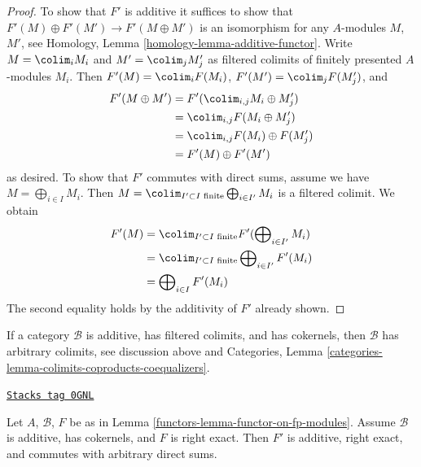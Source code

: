 \begin{proof}
To show that $F'$ is additive it suffices to show
that $F'(M) \oplus F'(M') \to F'(M \oplus M')$ is an isomorphism for
any $A$-modules $M$, $M'$, see
Homology, Lemma \ref{homology-lemma-additive-functor}.
Write $M = \colim_i M_i$ and $M' = \colim_j M'_j$ as filtered colimits
of finitely presented $A$-modules $M_i$. Then
$F'(M) = \colim_i F(M_i)$, $F'(M') = \colim_j F(M'_j)$, and
\begin{align*}
F'(M \oplus M')
& =
F'(\colim_{i, j} M_i \oplus M'_j) \\
& =
\colim_{i, j} F(M_i \oplus M'_j) \\
& =
\colim_{i, j} F(M_i) \oplus F(M'_j) \\
& =
F'(M) \oplus F'(M')
\end{align*}
as desired. To show that $F'$ commutes with direct sums, assume
we have $M = \bigoplus_{i \in I} M_i$. Then
$M = \colim_{I' \subset I\text{ finite}} \bigoplus_{i \in I'} M_i$
is a filtered colimit. We obtain
\begin{align*}
F'(M)
& =
\colim_{I' \subset I\text{ finite}}
F'(\bigoplus\nolimits_{i \in I'} M_i) \\
& =
\colim_{I' \subset I\text{ finite}}
\bigoplus\nolimits_{i \in I'} F'(M_i) \\
& =
\bigoplus\nolimits_{i \in I} F'(M_i)
\end{align*}
The second equality holds by the additivity of $F'$ already shown.
\end{proof}

If a category $\mathcal{B}$ is additive, has filtered colimits, and
has cokernels, then $\mathcal{B}$ has arbitrary colimits, see
discussion above and Categories, Lemma
\ref{categories-lemma-colimits-coproducts-coequalizers}.

\begin{lemma}
\label{functors-lemma-functor-on-fp-modules-right-exact}
\href{https://stacks.math.columbia.edu/tag/0GNL}{\texttt{Stacks tag 0GNL}}

Let $A$, $\mathcal{B}$, $F$ be as in Lemma \ref{functors-lemma-functor-on-fp-modules}.
Assume $\mathcal{B}$ is additive, has cokernels, and $F$ is right exact. Then
$F'$ is additive, right exact, and commutes with arbitrary direct sums.
\end{lemma}

